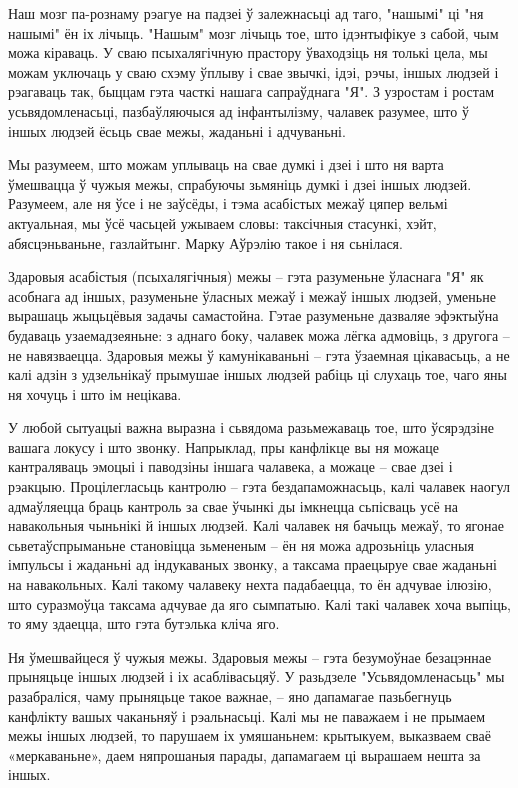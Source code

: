 Наш мозг па-рознаму рэагуе на падзеі ў залежнасьці ад таго, "нашымі" ці "ня нашымі" ён іх лічыць. "Нашым" мозг лічыць тое, што ідэнтыфікуе з сабой, чым можа кіраваць. У сваю псыхалягічную прастору ўваходзіць ня толькі цела, мы можам уключаць у сваю схэму ўплыву і свае звычкі, ідэі, рэчы, іншых людзей і рэагаваць так, быццам гэта часткі нашага сапраўднага "Я". З узростам і ростам усьвядомленасьці, пазбаўляючыся ад інфантылізму, чалавек разумее, што ў іншых людзей ёсьць свае межы, жаданьні і адчуваньні. 

Мы разумеем, што можам уплываць на свае думкі і дзеі і што ня варта ўмешвацца ў чужыя межы, спрабуючы зьмяніць думкі і дзеі іншых людзей. Разумеем, але ня ўсе і не заўсёды, і тэма асабістых межаў цяпер вельмі актуальная, мы ўсё часьцей ужываем словы: таксічныя стасункі, хэйт, абясцэньваньне, газлайтынг. Марку Аўрэлію такое і ня сьнілася.

Здаровыя асабістыя (псыхалягічныя) межы – гэта разуменьне ўласнага "Я" як асобнага ад іншых, разуменьне ўласных межаў і межаў іншых людзей, уменьне вырашаць жыцьцёвыя задачы самастойна. Гэтае разуменьне дазваляе эфэктыўна будаваць узаемадзеяньне: з аднаго боку, чалавек можа лёгка адмовіць, з другога – не навязваецца. Здаровыя межы ў камунікаваньні – гэта ўзаемная цікавасьць, а не калі адзін з удзельнікаў прымушае іншых людзей рабіць ці слухаць тое, чаго яны ня хочуць і што ім нецікава.

У любой сытуацыі важна выразна і сьвядома разьмежаваць тое, што ўсярэдзіне вашага локусу і што звонку. Напрыклад, пры канфлікце вы ня можаце кантраляваць эмоцыі і паводзіны іншага чалавека, а можаце – свае дзеі і рэакцыю. Процілегласьць кантролю – гэта бездапаможнасьць, калі чалавек наогул адмаўляецца браць кантроль за свае ўчынкі ды імкнецца сьпісваць усё на навакольныя чыньнікі й іншых людзей. Калі чалавек ня бачыць межаў, то ягонае сьветаўспрыманьне становіцца зьмененым – ён ня можа адрозьніць уласныя імпульсы і жаданьні ад індукаваных звонку, а таксама праецыруе свае жаданьні на навакольных. Калі такому чалавеку нехта падабаецца, то ён адчувае ілюзію, што суразмоўца таксама адчувае да яго сымпатыю. Калі такі чалавек хоча выпіць, то яму здаецца, што гэта бутэлька кліча яго.

Ня ўмешвайцеся ў чужыя межы. Здаровыя межы – гэта безумоўнае безацэннае прыняцьце іншых людзей і іх асаблівасьцяў. У разьдзеле "Усьвядомленасьць" мы разабраліся, чаму прыняцьце такое важнае, – яно дапамагае пазьбегнуць канфлікту вашых чаканьняў і рэальнасьці. Калі мы не паважаем і не прымаем межы іншых людзей, то парушаем іх умяшаньнем: крытыкуем, выказваем сваё «меркаваньне», даем няпрошаныя парады, дапамагаем ці вырашаем нешта за іншых. 

